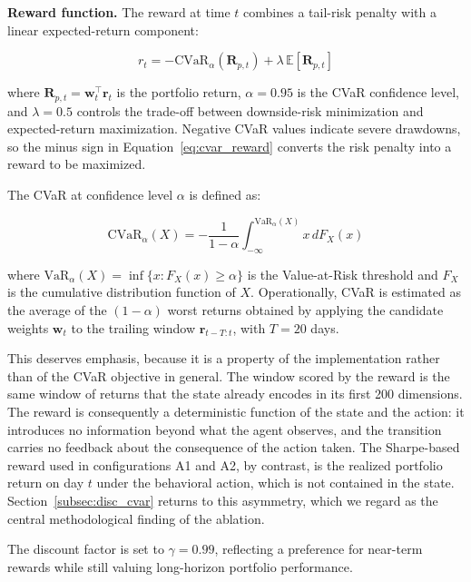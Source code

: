 \textbf{Reward function.}
The reward at time $t$ combines a tail-risk penalty with a linear expected-return
component:

\begin{equation}
  r_t = -\text{CVaR}_{\alpha}(\mathbf{R}_{p,t}) + \lambda \, \mathbb{E}[\mathbf{R}_{p,t}]
  \label{eq:cvar_reward}
\end{equation}

where $\mathbf{R}_{p,t} = \mathbf{w}_t^\top \mathbf{r}_t$ is the portfolio return,
$\alpha = 0.95$ is the CVaR confidence level, and $\lambda = 0.5$ controls the
trade-off between downside-risk minimization and expected-return maximization.
Negative CVaR values indicate severe drawdowns, so the minus sign in
Equation~\eqref{eq:cvar_reward} converts the risk penalty into a reward to be
maximized.

The CVaR at confidence level $\alpha$ is defined as:

\begin{equation}
  \text{CVaR}_{\alpha}(X) = -\frac{1}{1-\alpha}
  \int_{-\infty}^{\text{VaR}_\alpha(X)} x \, dF_X(x)
  \label{eq:cvar_def}
\end{equation}

where $\text{VaR}_\alpha(X) = \inf\{x : F_X(x) \geq \alpha\}$ is the
Value-at-Risk threshold and $F_X$ is the cumulative distribution function of $X$.
Operationally, CVaR is estimated as the average of the $(1-\alpha)$ worst returns
obtained by applying the candidate weights $\mathbf{w}_t$ to the trailing window
$\mathbf{r}_{t-T:t}$, with $T = 20$ days.

This deserves emphasis, because it is a property of the implementation rather
than of the CVaR objective in general.
The window scored by the reward is the same window of returns that the state
already encodes in its first 200 dimensions.
The reward is consequently a deterministic function of the state and the action:
it introduces no information beyond what the agent observes, and the transition
carries no feedback about the consequence of the action taken.
The Sharpe-based reward used in configurations A1 and A2, by contrast, is the
realized portfolio return on day $t$ under the behavioral action, which is not
contained in the state.
Section~\ref{subsec:disc_cvar} returns to this asymmetry, which we regard as the
central methodological finding of the ablation.

The discount factor is set to $\gamma = 0.99$, reflecting a preference for near-term
rewards while still valuing long-horizon portfolio performance.

